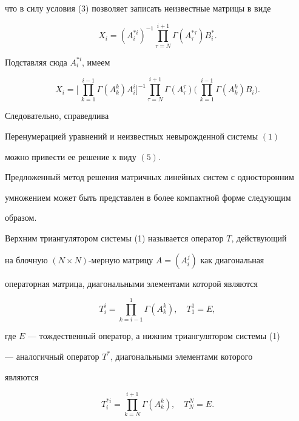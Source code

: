 что в силу условия (3) позволяет записать неизвестные матрицы в виде 


$$ 


X_i=(A^{*i}_i)^{-1}\prod^{i+1}_{\tau=N} 


\Gamma(A^{*\tau}_\tau)B^*_i. 


$$ 


Подставляя сюда $A^{*i}_i$, имеем 


\begin{equation} 


X_i=\bigg[\,\prod^{i-1}_{k=1}\Gamma(A^k_k)A^i_i\bigg]^{-1} 


\prod^{i+1}_{\tau=N}\Gamma(A^\tau_\tau)\bigg(\, 


\prod^{i-1}_{k=1}\Gamma(A^k_k)B_i\bigg). 


\end{equation} 


 


Следовательно, справедлива 


 


\begin{thm} 


Перенумерацией уравнений и неизвестных невырожденной системы $(1)$ 


можно привести ее решение к виду $(5)$. 


\end{thm} 


 


Предложенный метод решения матричных линейных систем с односторонним 


умножением может быть представлен в более компактной форме следующим 


образом. 


 


\begin{defn} 


Верхним триангулятором системы (1) называется оператор $T$, действующий 


на блочную $(N\times N)$-мерную матрицу $A=(A^j_i)$ как диагональная 


операторная матрица, диагональными элементами которой являются 


$$ 


T^i_i=\prod^1_{k=i-1}\Gamma(A^k_k),\quad T^1_1=E, 


$$ 


где $E$ --- тождественный оператор, а нижним триангулятором системы (1) 


--- аналогичный оператор $T^*$, диагональными элементами которого 


являются 


$$ 


T^{*i}_i=\prod^{i+1}_{k=N}\Gamma(A^k_k),\quad T^N_N=E. 


$$ 


\end{defn} 


